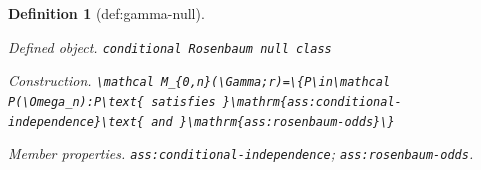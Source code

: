 \documentclass{article}
\newtheorem{definition}{Definition}
\begin{document}
\begin{definition}[def:gamma-null]\label{def:gamma-null}
\par\smallskip\noindent\emph{Defined object.} \texttt{conditional Rosenbaum null class}
\par\smallskip\noindent\emph{Construction.} \texttt{\textbackslash{}\allowbreak{}mathcal M\_\allowbreak{}\{0,\allowbreak{}n\}\allowbreak{}(\textbackslash{}\allowbreak{}Gamma;\allowbreak{}r)=\allowbreak{}\textbackslash{}\allowbreak{}\{P\textbackslash{}\allowbreak{}in\textbackslash{}\allowbreak{}mathcal P(\textbackslash{}\allowbreak{}Omega\_\allowbreak{}n):\allowbreak{}P\textbackslash{}\allowbreak{}text\{ satisfies \}\allowbreak{}\textbackslash{}\allowbreak{}mathrm\{ass:\allowbreak{}conditional-\allowbreak{}independence\}\allowbreak{}\textbackslash{}\allowbreak{}text\{ and \}\allowbreak{}\textbackslash{}\allowbreak{}mathrm\{ass:\allowbreak{}rosenbaum-\allowbreak{}odds\}\allowbreak{}\textbackslash{}\allowbreak{}\}\allowbreak{}}
\par\smallskip\noindent\emph{Member properties.} \texttt{ass:\allowbreak{}conditional-\allowbreak{}independence}; \texttt{ass:\allowbreak{}rosenbaum-\allowbreak{}odds}.
\end{definition}
\end{document}
